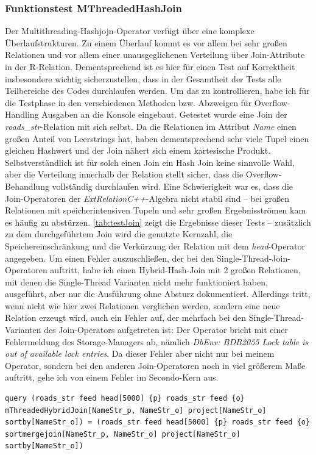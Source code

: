 \documentclass[a4paper,12pt,twoside]{article}
\newcommand{\Fb}[1]{\textit{#1}} %
\begin{document}
\subsubsection{Funktionstest MThreadedHashJoin}

Der Multithreading-Hashjojn-Operator verfügt über eine komplexe Überlaufstrukturen. Zu einem Überlauf kommt es vor allem bei sehr großen Relationen und vor allem einer unausgeglichenen Verteilung über Join-Attribute in der R-Relation. Dementsprechend ist es hier für einen Test auf Korrektheit insbesondere wichtig sicherzustellen, dass in der Gesamtheit der Tests alle Teilbereiche des Codes durchlaufen werden. Um das zu kontrollieren, habe ich für die Testphase in den verschiedenen Methoden bzw. Abzweigen für Overflow-Handling Ausgaben an die Konsole eingebaut. Getestet wurde eine Join der \Fb{roads\_str}-Relation mit sich selbst. Da die Relationen im Attribut \Fb{Name} einen großen Anteil von Leerstrings hat, haben dementsprechend sehr viele Tupel einen gleichen Hashwert und der Join nähert sich einem kartesische Produkt. Selbstverständlich ist für solch einen Join ein Hash Join keine sinnvolle Wahl, aber die Verteilung innerhalb der Relation stellt sicher, dass die Overflow-Behandlung vollständig durchlaufen wird. Eine Schwierigkeit war es, dass die Join-Operatoren der \Fb{ExtRelationC++}-Algebra nicht stabil sind -- bei großen Relationen mit speicherintensiven Tupeln und sehr großen Ergebnisströmen kam es häufig zu abstürzen. \autoref{tab:testJoin} zeigt die Ergebnisse dieser Tests -- zusätzlich zu dem durchgeführtem Join wird die genutzte Kernzahl, die Speichereinschränkung und die Verkürzung der Relation mit dem \Fb{head}-Operator angegeben. Um einen Fehler auszuschließen, der bei den Single-Thread-Join-Operatoren auftritt, habe ich einen Hybrid-Hash-Join mit 2 großen Relationen, mit denen die Single-Thread Varianten nicht mehr funktioniert haben, ausgeführt, aber nur die Ausführung ohne Absturz dokumentiert. Allerdings tritt, wenn nicht wie hier zwei Relationen verglichen werden, sondern eine neue Relation erzeugt wird, auch ein Fehler auf, der mehrfach bei den Single-Thread-Varianten des Join-Operators aufgetreten ist: Der Operator bricht mit einer Fehlermeldung des Storage-Managers ab, nämlich \Fb{DbEnv: BDB2055 Lock table is out of available lock entries}. Da dieser Fehler aber nicht nur bei meinem Operator, sondern bei den anderen Join-Operatoren noch in viel größerem Maße auftritt, gehe ich von einem Fehler im Secondo-Kern aus.

\begin{minipage}{\linewidth}
	\begin{lstlisting}[caption={Beispiel Testqueries für den Join-Operator}, label=list:testjoinsort]
	query (roads_str feed head[5000] {p} roads_str feed {o} mThreadedHybridJoin[NameStr_p, NameStr_o] project[NameStr_o] sortby[NameStr_o]) = (roads_str feed head[5000] {p} roads_str feed {o} sortmergejoin[NameStr_p, NameStr_o] project[NameStr_o] sortby[NameStr_o])
	\end{lstlisting}
\end{minipage}
\end{document}

